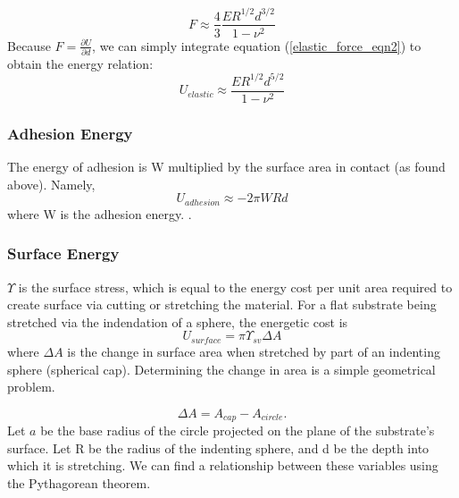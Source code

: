 \begin{equation}
F \approx \frac{4}{3}\frac{ER^{1/2}d^{3/2}}{1-\nu^2}
\label{elastic_force_eqn2}
\end{equation}
Because $F = \frac{\partial U}{\partial d}$, we can simply integrate equation (\ref{elastic_force_eqn2}) to obtain the energy relation:
\begin{equation}
\label{elastic_energy}
U_{elastic} \approx  \frac{ER^{1/2}d^{5/2}}{1-\nu^2}
\end{equation}


\subsubsection{Adhesion Energy}
The energy of adhesion is W multiplied by the surface area in contact (as found above). Namely,
\begin{equation}
\label{W_energy}
U_{adhesion} \approx -2\pi W R d 
\end{equation}
where W is the adhesion energy. . 



\subsubsection{Surface Energy}
$\Upsilon$ is the surface stress, which is equal to the energy cost per unit area required to create surface via cutting or stretching the material. For a flat substrate being stretched via the indendation of a sphere, the energetic cost is
\begin{equation}
\label{generic_surface_energy}
U_{surface} = \pi \Upsilon_{sv}\Delta A
\end{equation}
where $\Delta A$ is the change in surface area when stretched by part of an indenting sphere (spherical cap). Determining the change in area is a simple geometrical problem.

\begin{equation}
\Delta A = A_{cap} - A_{circle}. 
\end{equation}
Let $ a $ be the base radius of the circle projected on the plane of the substrate's surface. Let R be the radius of the indenting sphere, and d be the depth into which it is stretching. We can find a relationship between these variables using the Pythagorean theorem.

